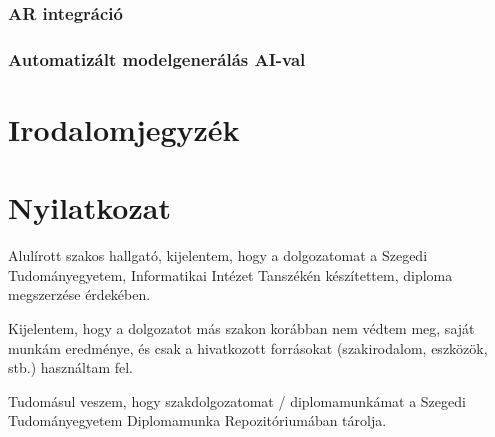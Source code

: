 \documentclass[12pt]{report}
\begin{document}
        \subsection{AR integráció}
        \subsection{Automatizált modelgenerálás AI-val}
        
        \chapter*{Irodalomjegyzék}
        
        \chapter*{Nyilatkozat}
        
        
        
        
        \noindent
        Alulírott \makebox[4cm]{\dotfill} szakos hallgató, kijelentem, hogy a dolgozatomat a Szegedi Tudományegyetem, Informatikai Intézet \makebox[4cm]{\dotfill} Tanszékén készítettem, \makebox[4cm]{\dotfill} diploma megszerzése érdekében.
        
        Kijelentem, hogy a dolgozatot más szakon korábban nem védtem meg, saját munkám eredménye, és csak a hivatkozott forrásokat (szakirodalom, eszközök, stb.) használtam fel.
        
        Tudomásul veszem, hogy szakdolgozatomat / diplomamunkámat a Szegedi Tudományegyetem Diplomamunka Repozitóriumában tárolja.
        
        \vspace*{2cm}
        
\end{document}
